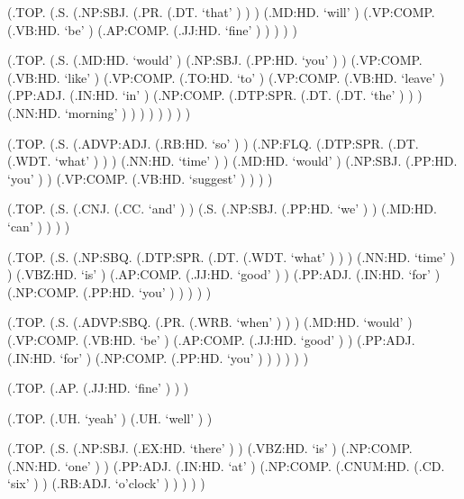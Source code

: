 \documentclass[10pt]{article}
\begin{document}
\begin{parsetree}  (.TOP. (.S. (.NP:SBJ. (.PR. (.DT. `that' ) ) ) (.MD:HD. `will' ) (.VP:COMP. (.VB:HD. `be' ) (.AP:COMP. (.JJ:HD. `fine' ) ) ) ) ) \end{parsetree}

\begin{parsetree}  (.TOP. (.S. (.MD:HD. `would' ) (.NP:SBJ. (.PP:HD. `you' ) ) (.VP:COMP. (.VB:HD. `like' ) (.VP:COMP. (.TO:HD. `to' ) (.VP:COMP. (.VB:HD. `leave' ) (.PP:ADJ. (.IN:HD. `in' ) (.NP:COMP. (.DTP:SPR. (.DT. (.DT. `the' ) ) ) (.NN:HD. `morning' ) ) ) ) ) ) ) ) \end{parsetree}

\begin{parsetree}  (.TOP. (.S. (.ADVP:ADJ. (.RB:HD. `so' ) ) (.NP:FLQ. (.DTP:SPR. (.DT. (.WDT. `what' ) ) ) (.NN:HD. `time' ) ) (.MD:HD. `would' ) (.NP:SBJ. (.PP:HD. `you' ) ) (.VP:COMP. (.VB:HD. `suggest' ) ) ) ) \end{parsetree}

\begin{parsetree}  (.TOP. (.S. (.CNJ. (.CC. `and' ) ) (.S. (.NP:SBJ. (.PP:HD. `we' ) ) (.MD:HD. `can' ) ) ) ) \end{parsetree}

\begin{parsetree}  (.TOP. (.S. (.NP:SBQ. (.DTP:SPR. (.DT. (.WDT. `what' ) ) ) (.NN:HD. `time' ) ) (.VBZ:HD. `is' ) (.AP:COMP. (.JJ:HD. `good' ) ) (.PP:ADJ. (.IN:HD. `for' ) (.NP:COMP. (.PP:HD. `you' ) ) ) ) ) \end{parsetree}

\begin{parsetree}  (.TOP. (.S. (.ADVP:SBQ. (.PR. (.WRB. `when' ) ) ) (.MD:HD. `would' ) (.VP:COMP. (.VB:HD. `be' ) (.AP:COMP. (.JJ:HD. `good' ) ) (.PP:ADJ. (.IN:HD. `for' ) (.NP:COMP. (.PP:HD. `you' ) ) ) ) ) ) \end{parsetree}

\begin{parsetree}  (.TOP. (.AP. (.JJ:HD. `fine' ) ) ) \end{parsetree}

\begin{parsetree}  (.TOP. (.UH. `yeah' ) (.UH. `well' ) ) \end{parsetree}

\begin{parsetree}  (.TOP. (.S. (.NP:SBJ. (.EX:HD. `there' ) ) (.VBZ:HD. `is' ) (.NP:COMP. (.NN:HD. `one' ) ) (.PP:ADJ. (.IN:HD. `at' ) (.NP:COMP. (.CNUM:HD. (.CD. `six' ) ) (.RB:ADJ. `o'clock' ) ) ) ) ) \end{parsetree}
\end{document}
